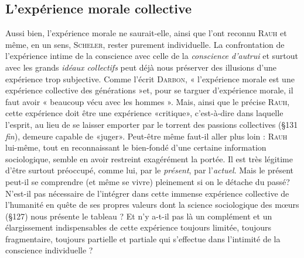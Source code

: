 \subsection{L'expérience morale collective}%
Aussi bien, l’expérience
morale ne saurait-elle, ainsi que l’ont reconnu \textsc{Rauh} et même, en un
sens, \textsc{Scheler}, rester purement individuelle. La confrontation de
l’expérience intime de la conscience avec celle de la {\it conscience d'autrui}
et surtout avec les grands {\it idéaux collectifs} peut déjà nous préserver
des illusions d’une expérience trop subjective. Comme l’écrit \textsc{Darbon},
« l'expérience morale est une expérience collective des générations »et,
pour se targuer d’expérience morale, il faut avoir « beaucoup vécu avec
les hommes ». Mais, ainsi que le précise \textsc{Rauh}, cette expérience doit
être une expérience «critique», c’est-à-dire dans laquelle l'esprit,
au lieu de se laisser emporter par le torrent des passions collectives
(\S 131 {\it fin}), demeure capable de «juger». Peut-être même faut-il
aller plus loin : \textsc{Rauh} lui-même, tout en reconnaissant le bien-fondé
d’une certaine information sociologique, semble en avoir restreint
exagérément la portée. Il est très légitime d’être surtout préoccupé,
comme lui, par le {\it présent}, par l’{\it actuel}. Mais le présent peut-il se
comprendre (et même se vivre) pleinement si on le détache du passé?
N’est-il pas nécessaire de l’intégrer dans cette immense expérience
collective de l'humanité en quête de ses propres valeurs dont la
science sociologique des mœurs (\S 127) nous présente le tableau ?
Et n’y a-t-il pas là un complément et un élargissement indispensables
de cette expérience toujours limitée, toujours fragmentaire, toujours
partielle et partiale qui s’effectue dans l'intimité de la conscience
individuelle ?

